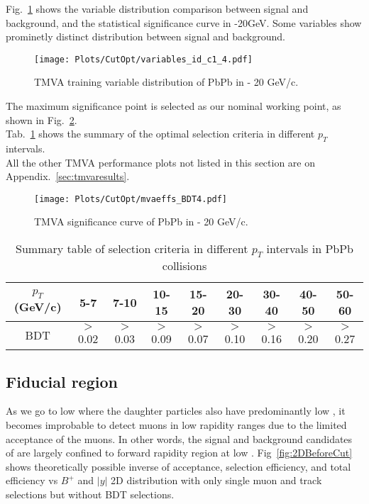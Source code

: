 Fig.~\ref{fig:tmvaPbPbvar4} shows the variable distribution comparison between signal and background, and the statistical significance curve in -20GeV. Some variables show prominetly distinct distribution between signal and background. \\

\begin{figure}[h]
\begin{center}
\texttt{[image: Plots/CutOpt/variables\_id\_c1\_4.pdf]}
\caption{TMVA training variable distribution of PbPb in  - 20 GeV/c.}
\label{fig:tmvaPbPbvar4}
\end{center}
\end{figure}

\clearpage
The maximum significance point is selected as our nominal working point, as shown in Fig.~\ref{fig:tmvaPbPbsig4}. \\
Tab.~\ref{tab:cutoptPbPb} shows the summary of the optimal selection criteria in different $p_{T}$ intervals. \\
All the other TMVA performance plots not listed in this section are on Appendix.~\ref{sec:tmvaresults}. \\

\begin{figure}[h]
\begin{center}
\texttt{[image: Plots/CutOpt/mvaeffs\_BDT4.pdf]}
\caption{TMVA significance curve of PbPb in  - 20 GeV/c.}
\label{fig:tmvaPbPbsig4}
\end{center}
\end{figure}

\begin{table}[h]
\centering
\begin{tabular}{|c|c|c|c|c|c|c|c|c|}
\hline
\textbf{$p_{T}$ (GeV/c)} & \textbf{5-7} & \textbf{7-10} & \textbf{10-15} & \textbf{15-20} & \textbf{20-30} & \textbf{30-40} & \textbf{40-50} & \textbf{50-60} \\
\hline
BDT & $>$0.02 & $>$0.03 & $>$0.09 & $>$0.07 & $>$0.10 & $>$0.16 & $>$0.20 & $>$0.27 \\
\hline
\end{tabular}
\caption{Summary table of selection criteria in different $p_{T}$ intervals in PbPb collisions}
\label{tab:cutoptPbPb}
\end{table}

\clearpage

\subsection{Fiducial region}
As we go to low \Bplus \pt where the daughter particles also have predominantly low \pt, it becomes improbable to detect muons in low rapidity ranges due to the limited acceptance of the muons. In other words, the signal and background candidates of \Bplus are largely confined to forward rapidity region at low \Bplus \pt. Fig~\ref{fig:2DBeforeCut} shows theoretically possible inverse of acceptance, selection efficiency, and total efficiency vs $B^{+}$ \pt and $|y|$ 2D distribution with only single muon and track selections but without BDT selections. 

